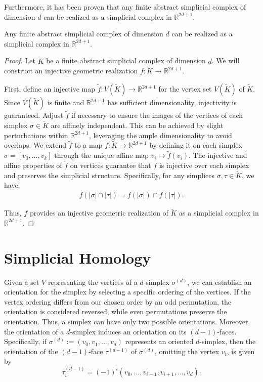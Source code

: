 Furthermore, it has been proven that any finite abstract simplicial complex of dimension
$d$ can be realized as a simplicial complex in $\mathbb{R}^{2d+1}$.

\begin{theorem}
	Any finite abstract simplicial complex of dimension $d$ can be realized as a simplicial
	complex in $\mathbb{R}^{2d+1}$.
\end{theorem}

\begin{proof}
	Let $\tilde{K}$ be a finite abstract simplicial complex of dimension $d$. We
	will construct an injective geometric realization
	$f: \tilde{K}\to \mathbb{R}^{2d+1}$.

	First, define an injective map $\tilde{f}: V(\tilde{K}) \to \mathbb{R}^{2d+1}$
	for the vertex set $V(\tilde{K})$ of $\tilde{K}$. Since $V(\tilde{K})$ is
	finite and $\mathbb{R}^{2d+1}$ has sufficient dimensionality, injectivity is guaranteed.
	Adjust $\tilde{f}$ if necessary to ensure the images of the vertices of each
	simplex $\sigma \in \tilde{K}$ are affinely independent. This can be achieved by
	slight perturbations within $\mathbb{R}^{2d+1}$, leveraging the ample
	dimensionality to avoid overlaps. We extend $\tilde{f}$ to a map $f: \tilde{K}\to \mathbb{R}^{2d+1}$ by defining
	it on each simplex $\sigma = [v_{0}, \ldots, v_{k}]$ through the unique affine
	map $v_{i} \mapsto \tilde{f}(v_{i})$. The injective and affine properties of $\tilde
	{f}$ on vertices guarantee that $f$ is injective over each simplex and preserves
	the simplicial structure. Specifically, for any simplices $\sigma, \tau \in \tilde
	{K}$, we have:
	\begin{align}
		f(|\sigma| \cap |\tau|) = f(|\sigma|) \cap f(|\tau|).
	\end{align}

	Thus, $f$ provides an injective geometric realization of $\tilde{K}$ as a simplicial
	complex in $\mathbb{R}^{2d+1}$.
\end{proof}

\section{Simplicial Homology}
\label{SimplicialHomology}
Given a set \( V \) representing the vertices of a \( d \)-simplex
\( \sigma^{(d)} \), we can establish an orientation for the simplex by selecting a
specific ordering of the vertices. If the vertex ordering differs from our chosen
order by an odd permutation, the orientation is considered reversed, while even permutations
preserve the orientation. Thus, a simplex can have only two possible orientations.
Moreover, the orientation of a \( d \)-simplex induces an orientation on its \( (d-1) \)-faces.
Specifically, if \( \sigma^{(d)} := (v_{0}, v_{1}, \ldots, v_{d}) \) represents an oriented
\( d \)-simplex, then the orientation of the \( (d-1) \)-face \( \tau^{(d-1)} \) of
\( \sigma^{(d)} \), omitting the vertex \( v_{i} \), is given by
\begin{equation}
\tau_{i}^{(d-1)} = (-1)^{i} (v_{0}, \ldots, v_{i-1}, v_{i+1}, \ldots, v_{d}).
\end{equation}

